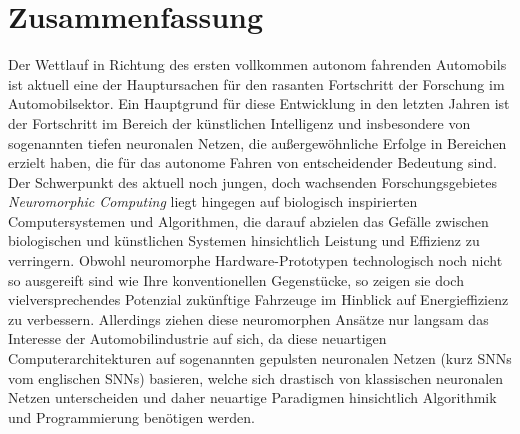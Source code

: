 \chapter*{Zusammenfassung}

Der Wettlauf in Richtung des ersten vollkommen autonom fahrenden Automobils ist aktuell eine der Hauptursachen f\"ur den rasanten Fortschritt der Forschung im Automobilsektor.
Ein Hauptgrund f\"ur diese Entwicklung in den letzten Jahren ist der Fortschritt im Bereich der k\"unstlichen Intelligenz und insbesondere von sogenannten tiefen neuronalen Netzen, die au{\ss}ergew\"ohnliche Erfolge in Bereichen erzielt haben, die f\"ur das autonome Fahren von entscheidender Bedeutung sind.
Der Schwerpunkt des aktuell noch jungen, doch wachsenden Forschungsgebietes \emph{Neuromorphic Computing} liegt hingegen auf biologisch inspirierten Computersystemen und Algorithmen, die darauf abzielen das Gef\"alle zwischen biologischen und k\"unstlichen Systemen hinsichtlich Leistung und Effizienz zu verringern.
Obwohl neuromorphe Hardware-Prototypen technologisch noch nicht so ausgereift sind wie Ihre konventionellen Gegenst\"ucke, so zeigen sie doch vielversprechendes Potenzial zuk\"unftige Fahrzeuge im Hinblick auf Energieffizienz zu verbessern.
Allerdings ziehen diese neuromorphen Ans\"atze nur langsam das Interesse der Automobilindustrie auf sich, da diese neuartigen Computerarchitekturen auf sogenannten gepulsten neuronalen Netzen (kurz \acsp{SNN} vom englischen \aclp{SNN}) basieren, welche sich drastisch von klassischen neuronalen Netzen unterscheiden und daher neuartige Paradigmen hinsichtlich Algorithmik und Programmierung ben\"otigen werden.

